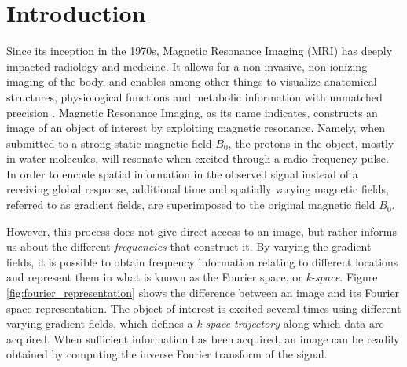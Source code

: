 
\cleardoublepage
\chapter{Introduction}

Since its inception in the 1970s, Magnetic Resonance Imaging (MRI) has deeply impacted radiology and medicine. It allows for a non-invasive, non-ionizing imaging of the body, and enables among other things to visualize anatomical structures, physiological functions and metabolic information with unmatched precision \citep{wright1997magnetic,feng2016compressed}.  Magnetic Resonance Imaging, as its name indicates,  constructs an image of an object of interest by exploiting magnetic resonance. Namely, when submitted to a strong static magnetic field $B_0$, the protons in the object, mostly in water molecules, will resonate when excited through a radio frequency pulse. In order to encode spatial information in the observed signal instead of a receiving global response, additional time and spatially varying magnetic fields, referred to as gradient fields, are superimposed to the original magnetic field $B_0$.

However, this process does not give direct access to an image, but rather informs us about the different \textit{frequencies} that construct it. By varying the gradient fields, it is possible to obtain frequency information relating to different locations and represent them in what is known as the Fourier space, or \textit{k-space}. Figure \ref{fig:fourier_representation} shows the difference between an image and its Fourier space representation. The object of interest is excited several times using different varying gradient fields, which defines a \textit{k-space trajectory} along which data are acquired. When sufficient information has been acquired, an image can be readily obtained by computing the inverse Fourier transform of the signal.

